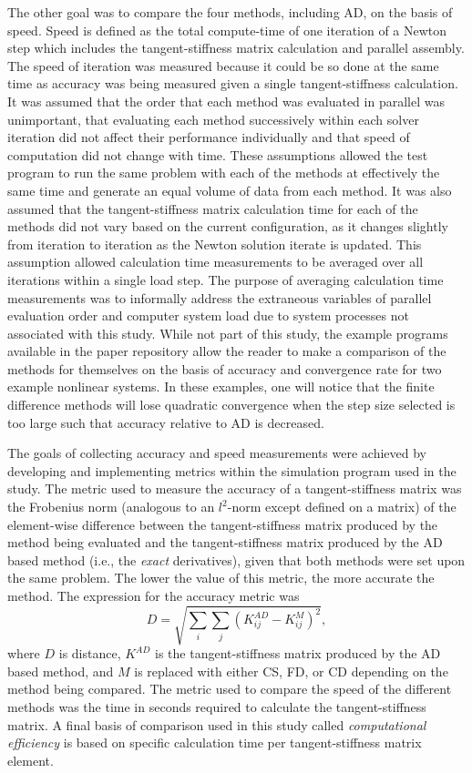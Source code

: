 \documentclass[preprint,12pt]{elsarticle}
\begin{document}
The other goal was to compare the four methods, including AD, on the basis of
speed. Speed is defined as the total compute-time of one iteration of a Newton
step which includes the tangent-stiffness matrix calculation and parallel assembly.
The speed of iteration was measured because it could be so done at the same
time as accuracy was being measured given a single tangent-stiffness
calculation.  It was assumed that the order that each method was evaluated in
parallel was unimportant, that evaluating each method successively within each
solver iteration did not affect their performance individually and that speed
of computation did not change with time. These assumptions allowed the test
program to run the same problem with each of the methods at effectively the
same time and generate an equal volume of data from each method. It was also
assumed that the tangent-stiffness matrix calculation time for each of the
methods did not vary based on the current configuration, as it changes slightly
from iteration to iteration as the Newton solution iterate is updated.  This
assumption allowed calculation time measurements to be averaged over all
iterations within a single load step. The purpose of averaging calculation time
measurements was to informally address the extraneous variables of parallel
evaluation order and computer system load due to system processes not
associated with this study. While not part of this study, the example programs
available in the paper repository allow the reader to make a comparison of the
methods for themselves on the basis of accuracy and convergence rate for two
example nonlinear systems. In these examples, one will notice that the finite
difference methods will lose quadratic convergence when the step size selected
is too large such that accuracy relative to AD is decreased.

The goals of collecting accuracy and speed measurements were achieved by
developing and implementing metrics within the simulation program used in the
study. The metric used to measure the accuracy of a tangent-stiffness matrix
was the Frobenius norm (analogous to an $l^2$-norm except defined on a matrix)
of the element-wise difference between the tangent-stiffness matrix produced by
the method being evaluated and the tangent-stiffness matrix produced by the AD
based method (i.e., the \emph{exact} derivatives), given that both methods were
set upon the same problem. The lower the value of this metric, the more
accurate the method. The expression for the accuracy metric was
%
\begin{equation} D = \sqrt{\sum_i \sum_j(K^{AD}_{ij} - K^{M}_{ij})^2},
\label{eqn:accuracy} \end{equation}
%
where $D$ is distance, $K^{AD}$ is the tangent-stiffness matrix produced by the
AD based method, and $M$ is replaced with either CS, FD, or CD depending on the
method being compared.  The metric used to compare the speed of the different
methods was the time in seconds required to calculate the tangent-stiffness
matrix. A final basis of comparison used in this study called
\emph{computational efficiency} is based on specific calculation time per
tangent-stiffness matrix element.
\end{document}
